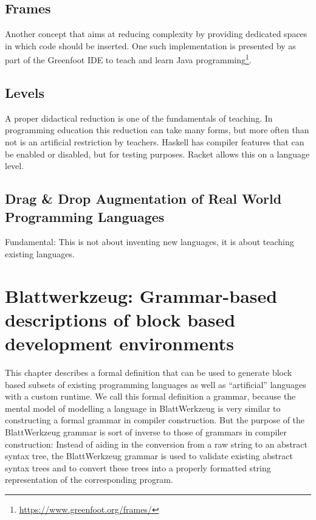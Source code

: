 \documentclass[]{report}
\begin{document}
\section{Frames}
\label{sec:frames}

Another concept that aims at reducing complexity by providing dedicated spaces in which code should be inserted. One such implementation is presented by \textcite{kollingFrameBasedEditingEasing2015} as part of the Greenfoot IDE to teach and learn Java programming\footnote{\url{https://www.greenfoot.org/frames/}}.

\section{Levels}
\label{sec:levels}

A proper didactical reduction is one of the fundamentals of teaching. In programming education this reduction can take many forms, but more often than not is an artificial restriction by teachers. Haskell has compiler features that can be enabled or disabled, but for testing purposes. Racket allows this on a language level.

\section{Drag \& Drop Augmentation of Real World Programming Languages}

Fundamental: This is not about inventing new languages, it is about teaching existing languages.

\chapter{Blattwerkzeug: Grammar-based descriptions of block based development environments}

This chapter describes a formal definition that can be used to generate block based subsets of existing programming languages as well as \enquote{artificial} languages with a custom runtime. We call this formal definition a grammar, because the mental model of modelling a language in Blatt\-Werkzeug is very similar to constructing a formal grammar in compiler construction. But the purpose of the Blatt\-Werkzeug grammar is sort of inverse to those of grammars in compiler construction: Instead of aiding in the conversion from a raw string to an abstract syntax tree, the Blatt\-Werkzeug grammar is used to validate existing abstract syntax trees and to convert these trees into a properly formatted string representation of the corresponding program.
\end{document}
